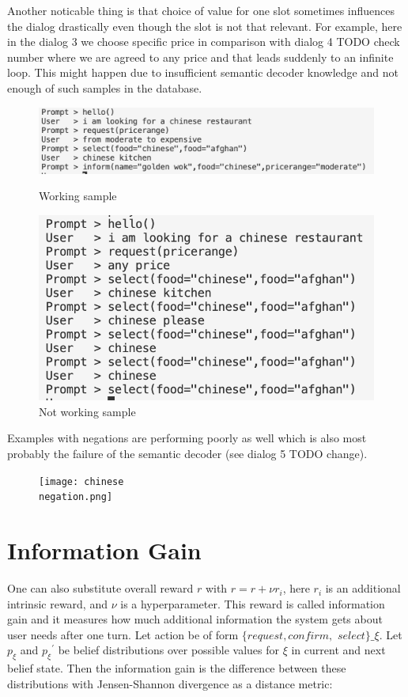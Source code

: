 \documentclass[12pt,titlepage,a4paper]{article}
\begin{document}
Another noticable thing is that choice of value for one slot sometimes influences the dialog drastically even though the slot is not that relevant. For example, here in the dialog 3 we choose specific price in comparison with dialog 4 TODO check number where we are agreed to any price and that leads suddenly to an infinite loop. This might happen due to insufficient semantic decoder knowledge and not enough of such samples in the database.
\begin{figure}[!htb]
      \includegraphics[width=\linewidth]{chinese_works.png}
      \caption{Working sample}
    \endminipage\hfill
      \includegraphics[width=\linewidth]{chinese_no_work.png}
      \caption{Not working sample}
    \endminipage
\end{figure}

Examples with negations are performing poorly as well which is also most probably the failure of the semantic decoder (see dialog 5 TODO change).

\begin{figure}
    \texttt{[image: chinese\\ negation.png]}
\end{figure}


\section{Information Gain}

One can also substitute overall reward $r$ with $r = r + \nu r_i$, here $r_i$ is an additional intrinsic reward, and $\nu$ is a hyperparameter. This reward is called information gain and it measures how much additional information the system gets about user needs after one turn. Let action be of form $\{request, confirm,$ $select\}\_\xi$. Let $p_{\xi}$ and ${p_{\xi}}^\prime$ be belief distributions over possible values for $\xi$ in current and next belief state. Then the informa\-tion gain is the difference between these distributions with Jensen-Shannon divergence as a distance metric:
\end{document}
